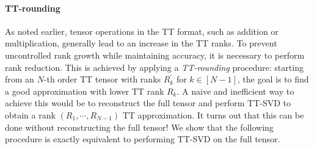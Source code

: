 \paragraph{TT-rounding} As noted earlier, tensor operations in the TT format, such as addition or multiplication, generally lead to an increase in the TT ranks. To prevent uncontrolled rank growth while maintaining accuracy, it is necessary to perform rank reduction. This is achieved by applying a \emph{TT-rounding} procedure: starting from an $N$-th order TT tensor with ranks $R^\prime_k$ for $k\in[N-1]$, the goal is to find a good approximation with lower TT rank $R_k$. A naive and inefficient way to achieve this would be to reconstruct the full tensor and perform TT-SVD to obtain a rank $(R_1,\cdots,R_{N-1})$ TT approximation. It turns out that this can be done without reconstructing the full tensor! We show that the following procedure is exactly equivalent to performing TT-SVD on the full tensor.

